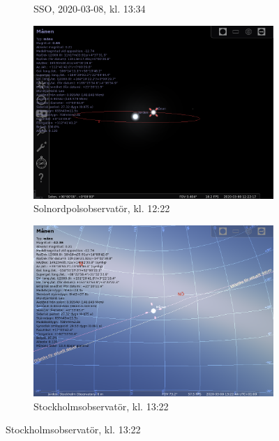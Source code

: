 \documentclass[./exercises.tex]{subfiles}
\begin{document}
\begin{itemize}
\begin{figure}[H]
\begin{subfigure}[b]{0.45\textwidth}
         \caption{SSO, 2020-03-08, kl. 13:34}
         \label{fig:y equals x}
     \end{subfigure}
     \hfill
     \begin{subfigure}[b]{0.45\textwidth}
         \centering
         \includegraphics[width=\textwidth]{Stellarium1/WaningGibbons/stellarium-006.png}
         \caption{Solnordpolsobservatör, kl. 12:22}
         \label{fig:three sin x}
     \end{subfigure}
     \hfill
     \begin{subfigure}[b]{0.45\textwidth}
         \centering
         \includegraphics[width=\textwidth]{Stellarium1/WaningGibbons/stellarium-007.png}
         \caption{Stockholmsobservatör, kl. 13:22}
         \label{fig:three sin x}
     \end{subfigure}

\end{figure}
\end{itemize}
\end{document}
